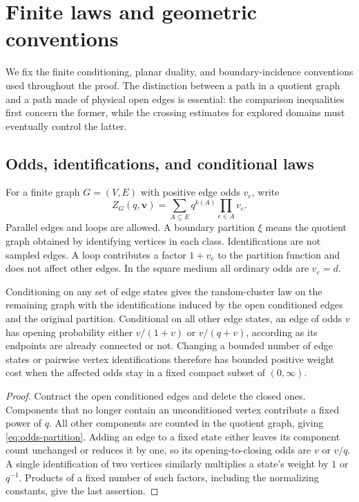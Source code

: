 \section{Finite laws and geometric conventions}\label{sec:conventions}

We fix the finite conditioning, planar duality, and boundary-incidence
conventions used throughout the proof. The distinction between a path
in a quotient graph and a path made of physical open edges is essential:
the comparison inequalities first concern the former, while the
crossing estimates for explored domains must eventually control the latter.

\subsection{Odds, identifications, and conditional laws}

For a finite graph $G=(V,E)$ with positive edge odds $v_e$, write
\begin{equation}\label{eq:odds-partition}
 Z_G(q,\mathbf v)=\sum_{A\subseteq E}q^{k(A)}\prod_{e\in A}v_e.
\end{equation}
Parallel edges and loops are allowed. A boundary partition $\xi$ means
the quotient graph obtained by identifying vertices in each class.
Identifications are not sampled edges. A loop contributes a factor
$1+v_e$ to the partition function and does not affect other edges.
In the square medium all ordinary odds are $v_e=d$.

\begin{lemma}
\label{lem:finite-conditioning}
Conditioning on any set of edge states gives the random-cluster law on
the remaining graph with the identifications induced by the open
conditioned edges and the original partition. Conditional on all other
edge states, an edge of odds $v$ has opening probability either
$v/(1+v)$ or $v/(q+v)$, according as its endpoints are already connected
or not. Changing a bounded number of edge states or pairwise vertex identifications
therefore has bounded positive weight cost when the affected odds stay
in a fixed compact subset of $(0,\infty)$.
\end{lemma}
\begin{proof}
Contract the open conditioned edges and delete the closed ones.
Components that no longer contain an unconditioned vertex contribute
a fixed power of $q$. All other components are counted in the quotient
graph, giving \eqref{eq:odds-partition}. Adding an edge to a fixed
state either leaves its component count unchanged or reduces it by
one, so its opening-to-closing odds are $v$ or $v/q$.
A single identification of two vertices similarly multiplies a state's weight
by $1$ or $q^{-1}$. Products of a fixed number of such factors, including
the normalizing constants, give the last assertion.
\end{proof}

